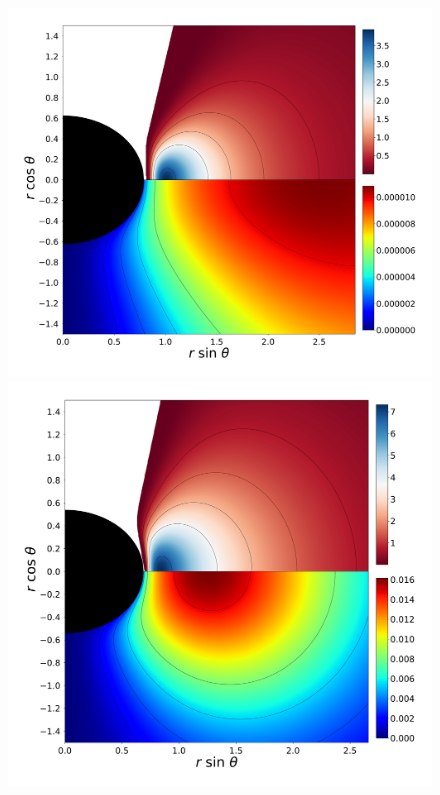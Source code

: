 \documentclass[twocolumn,aps,showpacs,showkeys,prd,superscriptaddress,byrevtex, amsmath]{revtex4-1}
\begin{document}
\begin{figure}
\centering
\includegraphics[scale=0.12]{figures/fig6_I_10.pdf}
\hspace{-0.4cm}
\includegraphics[scale=0.12]{figures/fig6_IV_10.pdf}
\hspace{-0.4cm}

\end{figure}
\end{document}
